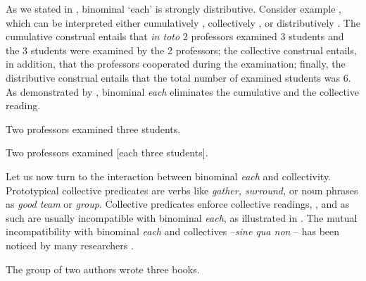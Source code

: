 \documentclass[output=paper,colorlinks,citecolor=brown,newtxmath]{langscibook}
\begin{document}
As we stated in , binominal `each' is strongly distributive. Consider example , which can be interpreted either cumulatively , collectively , or distributively . The cumulative construal entails that \textit{in toto} 2 professors examined 3 students and the 3 students were examined by the 2 professors; the collective construal entails, in addition, that the professors cooperated during the examination; finally, the distributive construal entails that the total number of examined students was 6.  As demonstrated by , binominal \textit{each} eliminates the cumulative and the collective reading.

\ea\label{ex:line216} Two professors examined three students.
\z\z

\ea\label{ex:line220} Two professors examined {[}each three students{]}.
\z\z

\noindent Let us now turn to the interaction between binominal \textit{each} and collectivity. Prototypical collective predicates are verbs like \textit{gather, surround,} or noun phrases as \textit{good team} or \textit{group}. Collective predicates enforce collective readings, , and as such are usually incompatible with binominal \textit{each}, as illustrated in . The mutual incompatibility with binominal \textit{each} and collectives --\textit{sine qua non} -- has been noticed by many researchers \citep{Dowty1987,Brisson2003,Winter2002,Docekal2012}.


\ea\label{ex:line228} The group of two authors wrote three books.
\z\z
\end{document}
